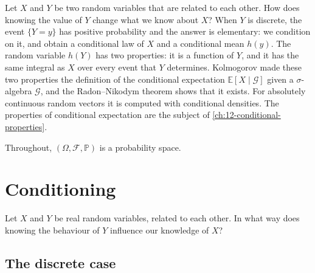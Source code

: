 
Let $X$ and $Y$ be two random variables that are related to each other. How does knowing the
value of $Y$ change what we know about $X$? When $Y$ is discrete, the event $\{Y=y\}$ has
positive probability and the answer is elementary: we condition on it, and obtain a conditional
law of $X$ and a conditional mean $h(y)$. The random variable $h(Y)$ has two properties: it is
a function of $Y$, and it has the same integral as $X$ over every event that $Y$ determines.
Kolmogorov made these two properties the definition of the conditional expectation
$\mathbb E[X\mid\mathcal G]$ given a $\sigma$-algebra $\mathcal G$, and the Radon--Nikodym
theorem shows that it exists. For absolutely continuous random vectors it is computed with
conditional densities. The properties of conditional expectation are the subject of
\cref{ch:12-conditional-properties}.

Throughout, $(\Omega,\mathcal F,\mathbb P)$ is a probability space.

\section{Conditioning}\label{sec:ce-conditioning}

Let $X$ and $Y$ be real random variables, related to each other. In what way does knowing the
behaviour of $Y$ influence our knowledge of $X$?

\subsection{The discrete case}\label{sec:ce-discrete}

